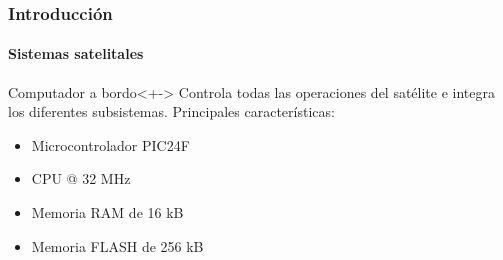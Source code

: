 \documentclass[xcolor=dvipsnames]{beamer}
\begin{document}
	\begin{frame}[squeeze]
        \frametitle{Introducción}
        \framesubtitle{Sistemas satelitales}
        \vspace{-0.5cm}
        \begin{figure}[t]\centering
            \hspace{1cm}
        \end{figure}
        
        \begin{block}{Computador a bordo}<+->
            Controla todas las operaciones del satélite e integra los diferentes subsistemas. Principales características:
            \begin{itemize}
                \item Microcontrolador PIC24F
                \item CPU @ 32 MHz
                \item Memoria RAM de 16 kB
                \item Memoria FLASH de 256 kB
            \end{itemize}
        \end{block}

    \end{frame}
\end{document}
